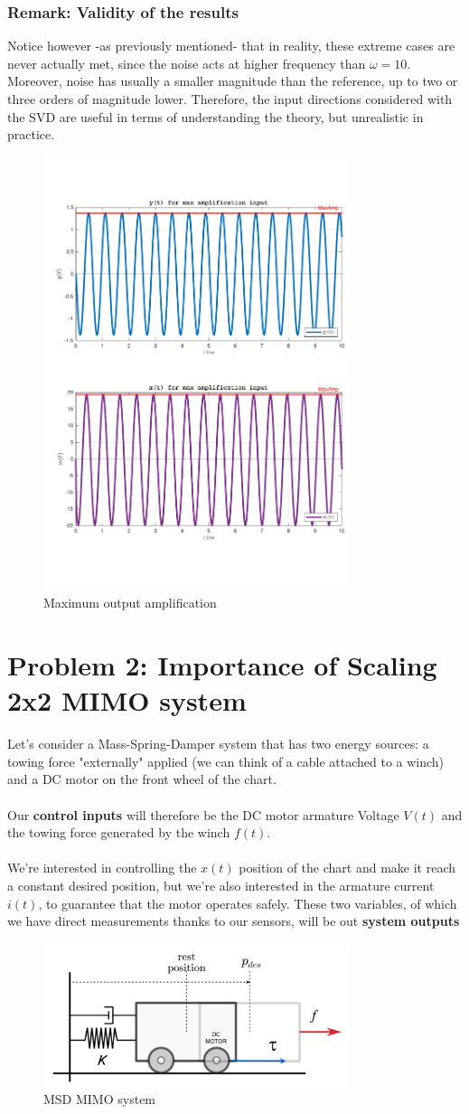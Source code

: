 \documentclass[a4paper, 12pt]{article}
\def\FigureFive{\centering\includegraphics[width=0.8\textwidth]{Figures/fig05.pdf}}
\def\FigureSix{\centering\includegraphics[width=0.8\textwidth]{Figures/fig06.pdf}}
\begin{document}
\subsubsection*{Remark: Validity of the results}
Notice however -as previously mentioned- that in reality, these extreme cases are never actually met, since the noise acts at higher frequency than $\omega = 10$. Moreover, noise has usually a smaller magnitude than the reference, up to two or three orders of magnitude lower. Therefore, the input directions considered with the SVD are useful in terms of understanding the theory, but unrealistic in practice.
\begin{figure}[h!]
    \FigureFive
    \caption{Maximum output amplification}
    \label{fig:fig05}
\end{figure}

\clearpage
\section{Problem 2: Importance of Scaling 2x2 MIMO system}
Let's consider a Mass-Spring-Damper system that has two energy sources: a towing force "externally" applied  (we can think of a cable attached to a winch) and a DC motor on the front wheel of the chart.\\
\\ Our \textbf{control inputs} will therefore be the DC motor armature Voltage $V(t)$ and the towing force generated by the winch $f(t)$.\\\\
We're interested in controlling the $x(t)$ position of the chart and make it reach a constant desired position, but we're also interested in the armature current $i(t)$, to guarantee that the motor operates safely. These two variables, of which we have direct measurements thanks to our sensors, will be out \textbf{system outputs} 
\begin{figure}[h!]
    \FigureSix
    \caption{MSD MIMO system }
    \label{fig:fig06}
\end{figure}
\end{document}
